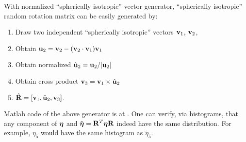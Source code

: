 \documentclass[12pt]{article}
\def\bmath#1{\mbox{\boldmath$#1$}}
\begin{document}
With normalized ``spherically isotropic'' vector generator,
``spherically isotropic'' random rotation matrix can be easily
generated by:
\begin{enumerate}
 \item Draw two independent ``spherically isotropic'' vectors ${\bf
 v}_1$, ${\bf v}_2$, 

 \item Obtain ${\bf u}_2 = {\bf v}_2 - ({\bf v}_2\cdot {\bf v}_1){\bf v}_1$

 \item Obtain normalized $\hat{\bf u}_2 = {\bf u}_2 / |{\bf u}_2|$

 \item Obtain cross product ${\bf v}_3 = {\bf v}_1 \times \hat{\bf u}_2$

 \item $\hat{\bf R} = [{\bf v}_1, \hat{\bf u}_2, {\bf v}_3]$.
\end{enumerate}

Matlab code of the above generator is at
.  One
can verify, via histograms, that any component of $\bmath{\eta}$ and
$\tilde{\bmath{\eta}}={\bf R}^T\bmath{\eta}{\bf R}$ indeed have the
same distribution.  For example, $\eta_5$ would have the same
histogram as $\tilde{\eta}_5$.



\end{document}

